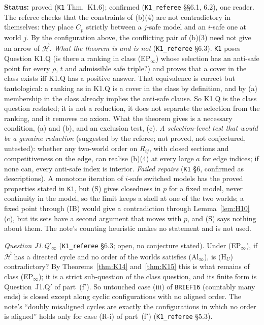 \documentclass[11pt]{article}
\theoremstyle{definition}
\theoremstyle{remark}
\newcommand{\src}[1]{\texttt{#1}}
\newcommand{\status}[1]{\par\smallskip\noindent\textbf{Status:} #1\par\smallskip}
\begin{document}
\status{proved (\src{K1} Thm.~K1.6); confirmed (\src{K1\_referee} \S\S6.1, 6.2), one reader. The referee checks that the constraints of (b)(4) are not contradictory in themselves: they place $C_p$ strictly between a $j$-safe model and an $i$-safe one at world $j$. By the configuration above, the conflicting pair of (b)(3) need not give an arrow of $\vec{\mathcal H}$. \emph{What the theorem is and is not} (\src{K1\_referee} \S6.3). \src{K1} poses Question K1.Q (is there a ranking in class (EP$_\infty$) whose selection has an anti-safe point for every $\rho$, $t$ and admissible safe triple?) and proves that a cover in the class exists iff K1.Q has a positive answer. That equivalence is correct but tautological: a ranking as in K1.Q is a cover in the class by definition, and by (a) membership in the class already implies the anti-safe clause. So K1.Q is the class question restated; it is not a reduction, it does not separate the selection from the ranking, and it removes no axiom. What the theorem gives is a necessary condition, (a) and (b), and an exclusion test, (c). \emph{A selection-level test that would be a genuine reduction} (suggested by the referee; not proved, not conjectured, untested): whether any two-world order on $R_{ij}$, with closed sections and competitiveness on the edge, can realise (b)(4) at every large $a$ for edge indices; if none can, every anti-safe index is interior. \emph{Failed repairs} (\src{K1} \S6, confirmed as descriptions). A monotone iteration of $i$-safe switched models has the proved properties stated in \src{K1}, but (S) gives closedness in $p$ for a fixed model, never continuity in the model, so the limit keeps a shell at one of the two worlds; a fixed point through (IB) would give a contradiction through Lemma~\ref{lem:H10}(c), but its sets have a second argument that moves with $p$, and (S) says nothing about them. The note's counting heuristic makes no statement and is not used.}

\emph{Question J1.Q$'_\infty$} (\src{K1\_referee} \S6.3; open, no conjecture stated). Under (EP$_\infty$), if $\vec{\mathcal H}$ has a directed cycle and no order of the worlds satisfies (Al$_\infty$), is (H$_U$) contradictory? By Theorems~\ref{thm:K14} and~\ref{thm:K15} this is what remains of class (EP$_\infty$); it is a strict sub-question of the class question, and its finite form is Question~J1.Q$'$ of part~(f$'$). So untouched case (iii) of \src{BRIEF16} (countably many ends) is closed except along cyclic configurations with no aligned order. The note's ``doubly misaligned cycles are exactly the configurations in which no order is aligned'' holds only for case (R-i) of part~(f$'$) (\src{K1\_referee} \S5.3).
\end{document}
